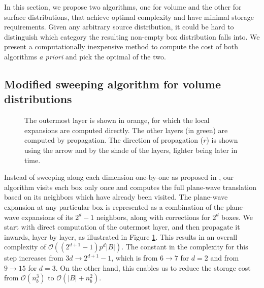 In this section, we propose two algorithms, one for volume and the other for surface distributions, that achieve optimal complexity and have minimal storage requirements. Given any arbitrary source distribution, it could be hard to distinguish which category the resulting non-empty box distribution falls into. We present a computationally inexpensive method to compute the cost of both algorithms {\em a priori} and pick the optimal of the two. 

\subsection{Modified sweeping algorithm for volume distributions} 
\label{sec:sweep}

\begin{figure}
\centering
{}
\caption{\small The outermost layer is shown in orange, for which the local expansions are computed directly. The other layers (in green) are computed by propagation. The direction of propagation ($r$) is shown using the arrow and by the shade of the layers, lighter being later in time. 
}
\label{fig:sweep}
\end{figure}

Instead of sweeping along each dimension one-by-one as proposed 
in \cite{fggt}, our algorithm visits each box only once and computes the full plane-wave
translation based on its neighbors which have already been visited. The
plane-wave expansion at any particular box is represented as a combination of the
plane-wave expansions of its $2^{d} -1$ neighbors, along with corrections for
$2^d$ boxes. We start with direct computation of the outermost layer, and then propagate it inwards, layer by layer, as illustrated in Figure \ref{fig:sweep}. This results in an overall complexity of $\mathcal{O}((2^{d+1} -1)p^d|B|)$. The constant in the complexity for this step increases from $3d\rightarrow2^{d+1} - 1$, which is
from $6\rightarrow7$ for $d=2$ and from $9\rightarrow15$ for $d=3$. On the other hand, this enables us to reduce the storage cost from $\mathcal{O}(n_b^3)$ to $\mathcal{O}(|B| + n_b^2)$.

